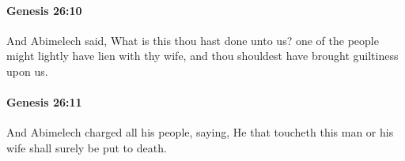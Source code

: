 		\paragraph{Genesis 26:10} %
			\label{GENESIS-26-10}

			And Abimelech said, What is this thou hast done unto us? one of the people might lightly have lien with thy wife, and thou shouldest have brought guiltiness upon us.


		\paragraph{Genesis 26:11} %
			\label{GENESIS-26-11}

			And Abimelech charged all his people, saying, He that toucheth this man or his wife shall surely be put to death.


